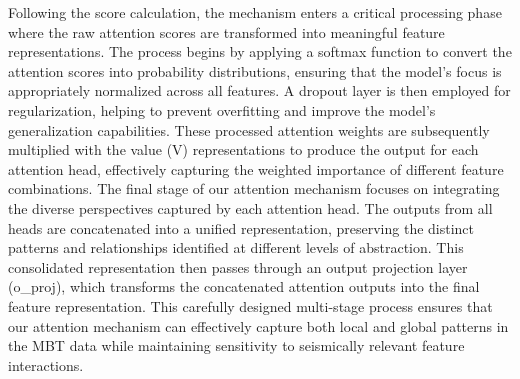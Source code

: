 \documentclass[fleqn,10pt]{wlscirep_mdpi_style}
\begin{document}
Following the score calculation, the mechanism enters a critical processing phase where the raw attention scores are transformed into meaningful feature representations. The process begins by applying a softmax function to convert the attention scores into probability distributions, ensuring that the model's focus is appropriately normalized across all features. A dropout layer is then employed for regularization, helping to prevent overfitting and improve the model's generalization capabilities. These processed attention weights are subsequently multiplied with the value (V) representations to produce the output for each attention head, effectively capturing the weighted importance of different feature combinations.
The final stage of our attention mechanism focuses on integrating the diverse perspectives captured by each attention head. The outputs from all heads are concatenated into a unified representation, preserving the distinct patterns and relationships identified at different levels of abstraction. This consolidated representation then passes through an output projection layer (o\_proj), which transforms the concatenated attention outputs into the final feature representation. This carefully designed multi-stage process ensures that our attention mechanism can effectively capture both local and global patterns in the MBT data while maintaining sensitivity to seismically relevant feature interactions.
\end{document}
